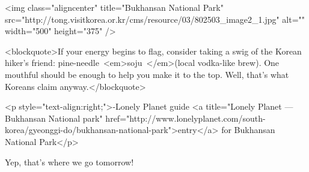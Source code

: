 \begin{post}
	\posttitle{}
	\begin{content}
<img class="aligncenter" title="Bukhansan National Park" src="http://tong.visitkorea.or.kr/cms/resource/03/802503_image2_1.jpg" alt="" width="500" height="375" />

<blockquote>If your energy begins to flag, consider taking a swig of the Korean hiker’s friend: pine-needle <em>soju </em>(local vodka-like brew). One mouthful should be enough to help you make it to the top. Well, that’s what Koreans claim anyway.</blockquote>

<p style="text-align:right;">-Lonely Planet guide <a title="Lonely Planet — Bukhansan National park" href="http://www.lonelyplanet.com/south-korea/gyeonggi-do/bukhansan-national-park">entry</a> for Bukhansan National Park</p>

Yep, that's where we go tomorrow!
	\end{content}
\end{post}
